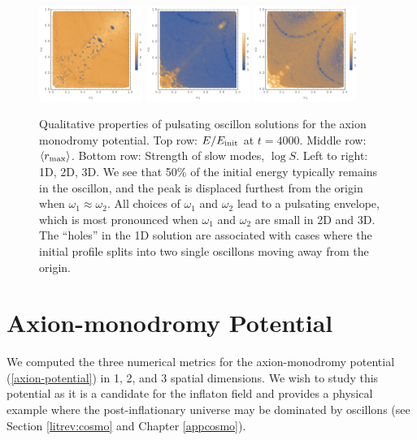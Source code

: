 \documentclass[11pt]{book}
\begin{document}
\begin{figure}[p]
    \includegraphics[width=0.3\textwidth]{plot/slow-mode-logscale-axion-1d.png}
    \includegraphics[width=0.3\textwidth]{plot/slow-mode-logscale-axion-2d.png}
    \includegraphics[width=0.3\textwidth]{plot/slow-mode-logscale-axion-3d.png}
    \caption{Qualitative properties of pulsating oscillon solutions for the axion monodromy potential. Top row: $E/E_{\rm init}$ at $t=4000$.
      Middle row: $\langle r_{\rm max}\rangle$.
      Bottom row: Strength of slow modes, $\log{S}$.\quad
      Left to right: 1D, 2D, 3D. We see that 50\% of the initial energy typically remains in the oscillon, and the peak is displaced furthest from the origin when $\omega_1 \approx \omega_2$. All choices of  $\omega_1$ and $\omega_2$ lead to a pulsating envelope, which is most pronounced when $\omega_1$ and $\omega_2$ are small in 2D and 3D. The ``holes'' in the 1D solution are associated with cases where the initial profile splits into two single oscillons moving away from the origin.}\label{axion-monodromy}
\end{figure}
\restoregeometry

\section{Axion-monodromy Potential}
We computed the three numerical metrics for the axion-monodromy potential (\ref {axion-potential}) in 1, 2, and 3 spatial dimensions. We wish to study this potential as it is a candidate for the inflaton field and provides a physical example where the post-inflationary universe may be dominated by oscillons (see Section \ref{litrev:cosmo} and Chapter \ref{appcosmo}). 
\end{document}
